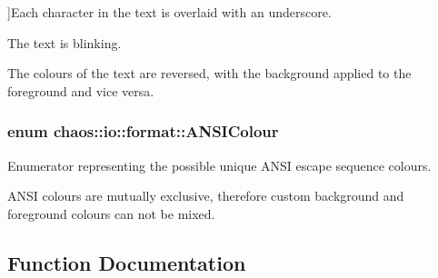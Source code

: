 \begin{Desc}
\begin{description}
{}]Each character in the text is overlaid with an underscore. \item[{\em 
\hypertarget{namespacechaos_1_1io_1_1format_af01119682ec0bc616b49641e0c2a7ccfacd3671458d96396a0fec66c993244186}{}A\+N\+S\+I\+\_\+\+A\+T\+T\+R\+\_\+\+B\+L\+I\+N\+K\label{namespacechaos_1_1io_1_1format_af01119682ec0bc616b49641e0c2a7ccfacd3671458d96396a0fec66c993244186}
}]The text is blinking. \item[{\em 
\hypertarget{namespacechaos_1_1io_1_1format_af01119682ec0bc616b49641e0c2a7ccfaa7b58f4c0365d47d2bc98a4587521806}{}A\+N\+S\+I\+\_\+\+A\+T\+T\+R\+\_\+\+R\+E\+V\+E\+R\+S\+E\label{namespacechaos_1_1io_1_1format_af01119682ec0bc616b49641e0c2a7ccfaa7b58f4c0365d47d2bc98a4587521806}
}]The colours of the text are reversed, with the background applied to the foreground and vice versa. \end{description}
\end{Desc}
\hypertarget{namespacechaos_1_1io_1_1format_aa30dcff2478ffc94e33504c8886a5b1a}{}
\subsubsection[{A\+N\+S\+I\+Colour}]{\setlength{\rightskip}{0pt plus 5cm}enum {\bf chaos\+::io\+::format\+::\+A\+N\+S\+I\+Colour}}\label{namespacechaos_1_1io_1_1format_aa30dcff2478ffc94e33504c8886a5b1a}


Enumerator representing the possible unique A\+N\+S\+I escape sequence colours. 

A\+N\+S\+I colours are mutually exclusive, therefore custom background and foreground colours can not be mixed. 

\subsection{Function Documentation}
\hypertarget{namespacechaos_1_1io_1_1format_a005869cc85ba6d9b0fcfad31cf56bda7}{}
